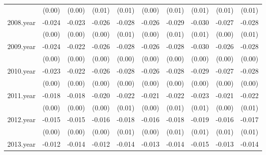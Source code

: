 {\begin{tabular}{l*{9}{c}}
          &   (0.00)         &   (0.00)         &   (0.01)         &   (0.01)         &   (0.00)         &   (0.01)         &   (0.01)         &   (0.01)         &   (0.01)         \\
[1em]
2008.year &   -0.024\sym{***}&   -0.023\sym{***}&   -0.026\sym{**} &   -0.028\sym{**} &   -0.026\sym{**} &   -0.029\sym{**} &   -0.030\sym{**} &   -0.027\sym{**} &   -0.028\sym{**} \\
          &   (0.00)         &   (0.00)         &   (0.00)         &   (0.01)         &   (0.00)         &   (0.01)         &   (0.01)         &   (0.00)         &   (0.01)         \\
[1em]
2009.year &   -0.024\sym{***}&   -0.022\sym{***}&   -0.026\sym{**} &   -0.028\sym{**} &   -0.026\sym{***}&   -0.028\sym{**} &   -0.030\sym{**} &   -0.026\sym{**} &   -0.028\sym{**} \\
          &   (0.00)         &   (0.00)         &   (0.00)         &   (0.00)         &   (0.00)         &   (0.00)         &   (0.00)         &   (0.00)         &   (0.00)         \\
[1em]
2010.year &   -0.023\sym{***}&   -0.022\sym{***}&   -0.026\sym{***}&   -0.028\sym{**} &   -0.026\sym{***}&   -0.028\sym{**} &   -0.029\sym{***}&   -0.027\sym{***}&   -0.028\sym{***}\\
          &   (0.00)         &   (0.00)         &   (0.00)         &   (0.00)         &   (0.00)         &   (0.00)         &   (0.00)         &   (0.00)         &   (0.00)         \\
[1em]
2011.year &   -0.018\sym{***}&   -0.018\sym{***}&   -0.020\sym{**} &   -0.022\sym{**} &   -0.021\sym{**} &   -0.022\sym{**} &   -0.023\sym{**} &   -0.021\sym{**} &   -0.022\sym{**} \\
          &   (0.00)         &   (0.00)         &   (0.00)         &   (0.01)         &   (0.00)         &   (0.01)         &   (0.01)         &   (0.00)         &   (0.01)         \\
[1em]
2012.year &   -0.015\sym{**} &   -0.015\sym{***}&   -0.016\sym{**} &   -0.018\sym{**} &   -0.016\sym{**} &   -0.018\sym{*}  &   -0.019\sym{**} &   -0.016\sym{**} &   -0.017\sym{**} \\
          &   (0.00)         &   (0.00)         &   (0.00)         &   (0.01)         &   (0.00)         &   (0.01)         &   (0.01)         &   (0.01)         &   (0.01)         \\
[1em]
2013.year &   -0.012\sym{**} &   -0.014\sym{***}&   -0.012\sym{**} &   -0.014\sym{*}  &   -0.013\sym{**} &   -0.014\sym{*}  &   -0.015\sym{*}  &   -0.013\sym{**} &   -0.014\sym{*}  \\

\end{tabular}}
